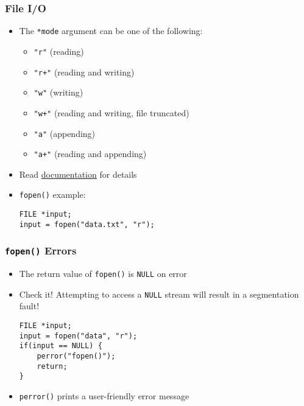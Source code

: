 \documentclass[14pt]{beamer}
\begin{document}
\begin{frame}[fragile]
\frametitle{File I/O}
\begin{itemize}
\item The \texttt{*mode} argument can be one of the following:
	\begin{itemize}
		\item \texttt{"r"} (reading)
		\item \texttt{"r+"} (reading and writing)
		\item \texttt{"w"} (writing)
		\item \texttt{"w+"} (reading and writing, file truncated)
		\item \texttt{"a"} (appending)
		\item \texttt{"a+"} (reading and appending)
	\end{itemize}
\item Read \underline{\href{http://man7.org/linux/man-pages/man3/fopen.3.html}{documentation}} for details
\item \texttt{fopen()} example:
\begin{lstlisting}[style=CStyle]
FILE *input;
input = fopen("data.txt", "r");
\end{lstlisting}
\end{itemize}
\end{frame}

\begin{frame}[fragile]
\frametitle{\texttt{fopen()} Errors}
\begin{itemize}
\item The return value of \texttt{fopen()} is \texttt{NULL} on error
\item Check it! Attempting to access a \texttt{NULL} stream will result in a segmentation fault!
\begin{lstlisting}[style=CStyle]
FILE *input;
input = fopen("data", "r");
if(input == NULL) {
	perror("fopen()");
	return;
}
\end{lstlisting}
\item \texttt{perror()} prints a user-friendly error message
\end{itemize}
\end{frame}
\end{document}
